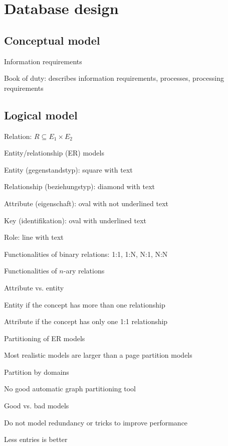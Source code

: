 \section{Database design}

\subsection{Conceptual model}
\enumstart
	\item Information requirements
	\item Book of duty: describes information requirements, processes, processing requirements 
\enumend

\subsection{Logical model}
\enumstart
	\item Relation: $R \subseteq E_1 \times E_2$
	\item Entity/relationship (ER) models
	\enumstart
		\item Entity (gegenstandstyp): square with text
		\item Relationship (beziehungstyp): diamond with text
		\item Attribute (eigenschaft): oval with not underlined text
		\item Key (identifikation): oval with underlined text
		\item Role: line with text
		\item Functionalities of binary relations: 1:1, 1:N, N:1, N:N
		\item Functionalities of $n$-ary relations
	\enumend
	\item Attribute vs. entity
	\enumstart
		\item Entity if the concept has more than one relationship
		\item Attribute if the concept has only one 1:1 relationship
	\enumend
	\item Partitioning of ER models
	\enumstart
		\item Most realistic models are larger than a page \arrow partition models
		\item Partition by domains
		\item No good automatic graph partitioning tool
	\enumend
	\item Good vs. bad models
	\enumstart
		\item Do not model redundancy or tricks to improve performance
		\item Less entries is better
